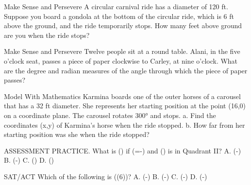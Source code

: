 \documentclass{article}
\newenvironment{practice}[2]{}{}        %
\newcommand{\answer}[1]{}               %
\newcommand{\placeholder}[2]{}          %
\newcommand{\uncertain}[2]{#1}          %
\newcommand{\te}[1]{}                   %
\begin{document}
\begin{practice}{35}{2}
Make Sense and Persevere A circular carnival ride has a diameter of 120 ft. Suppose you board a gondola at the bottom of the circular ride, which is 6 ft above the ground, and the ride temporarily stops. How many feet above ground are you when the ride stops?
\placeholder{illustration}{Circular carnival ride with x/y axes through wheel center, arrowheads both ends. Starting position (0,0) printed below bottom gondola, stopping position at upper-left rim. Red counterclockwise arc from downward radius through right side to upper-left radius labeled 240°.}
\answer{96 ft}
\te{Printed starting position (0,0) below the bottom gondola conflicts with the diagram's axes intersecting at the wheel center.}
\end{practice}
\begin{practice}{36}{2}
Make Sense and Persevere Twelve people sit at a round table. Alani, in the five o'clock seat, passes a piece of paper clockwise to Carley, at nine o'clock. What are the degree and radian measures of the angle through which the piece of paper passes?
\answer{120°; (\frac{2\pi}3) radians}
\end{practice}
\begin{practice}{37}{2}
Model With Mathematics Karmina boards one of the outer horses of a carousel that has a 32 ft diameter. She represents her starting position at the point (16,0) on a coordinate plane. The carousel rotates 300° and stops.
a. Find the coordinates (x,y) of Karmina's horse when the ride stopped.
b. How far from her starting position was she when the ride stopped?
\answer{a. (8,-13.9) b. (\approx16) ft}
\te{DOK \uncertain{2}{not listed in Item Analysis and no DOK printed next to this item; 2 inferred from adjacent applications}.}
\end{practice}
\begin{practice}{38}{2}
ASSESSMENT PRACTICE. What is (\sin\theta) if (\cos\theta=-) and (\theta) is in Quadrant II?
A. (-)
B. (-)
C. ()
D. ()
\answer{D}
\end{practice}
\begin{practice}{39}{2}
SAT/ACT Which of the following is (\tan(\frac{4\pi}6))?
A. (-)
B. (-)
C. (-)
D. (-)
\answer{A}
\end{practice}
\end{document}
